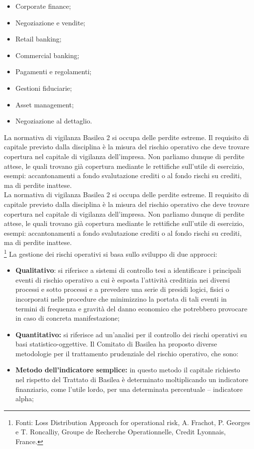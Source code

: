 \documentclass[titlepage]{article}
\begin{document}
\begin{itemize}
\begin{itemize}
\item	Corporate finance;
\item	Negoziazione e vendite;
\item	Retail banking;
\item	Commercial banking;
\item	Pagamenti e regolamenti;
\item	Gestioni fiduciarie;
\item	Asset management;
\item	Negoziazione al dettaglio.
 \end{itemize}
La normativa di vigilanza Basilea 2 si occupa delle perdite estreme. Il requisito di capitale previsto dalla disciplina è la misura del rischio operativo che deve trovare copertura nel capitale di vigilanza dell’impresa. Non parliamo dunque di perdite attese, le quali trovano già copertura mediante le rettifiche sull’utile di esercizio, esempi: accantonamenti a fondo svalutazione crediti o al fondo rischi su crediti, ma di perdite inattese.
\\

La normativa di vigilanza Basilea 2 si occupa delle perdite estreme. Il requisito di capitale previsto dalla disciplina è la misura del rischio operativo che deve trovare copertura nel capitale di vigilanza dell’impresa. Non parliamo dunque di perdite attese, le quali trovano già copertura mediante le rettifiche sull’utile di esercizio, esempi: accantonamenti a fondo svalutazione crediti o al fondo rischi su crediti, ma di perdite inattese.
\\
	\footnote {Fonti: Loss Distribution Approach for operational risk, A. Frachot, P. Georges e T. Roncalliy, Groupe de Recherche Operationnelle, Credit Lyonnais, France.} La gestione dei rischi operativi si basa sullo sviluppo di due approcci:

\begin{itemize}
\item	\textbf{Qualitativo}: si riferisce a sistemi di controllo tesi a identificare i principali eventi di rischio operativo a cui è esposta l’attività creditizia nei diversi processi e sotto processi e a prevedere una serie di presidi logici, fisici o incorporati nelle procedure che minimizzino la portata di tali eventi in termini di frequenza e gravità del danno economico che potrebbero provocare in caso di concreta manifestazione;

\item	\textbf{Quantitativo:} si riferisce ad un’analisi per il controllo dei rischi operativi su basi statistico-oggettive.
Il Comitato di Basilea ha proposto diverse metodologie per il trattamento prudenziale del rischio operativo, che sono:
\item 	\textbf{Metodo dell’indicatore semplice:} in questo metodo il capitale richiesto nel rispetto del Trattato di Basilea è determinato moltiplicando un indicatore finanziario, come l’utile lordo, per una determinata percentuale – indicatore alpha;


\end{itemize}
\end{itemize}
\end{document}
